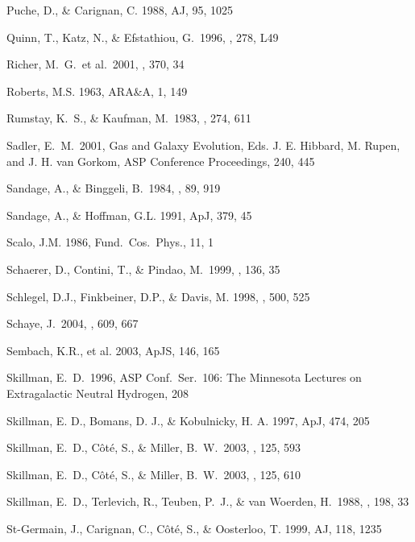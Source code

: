 \documentclass[preprint]{aastex}
\begin{document}
\begin{thebibliography}{}
Puche, D., \& Carignan, C. 1988, AJ, 95, 1025

Quinn, T., Katz, N., \& Efstathiou, G.\ 1996, \mnras, 278, L49 

Richer, M.~G.~et al.\ 2001, \aap, 370, 34 

Roberts, M.S. 1963, ARA\&A, 1, 149

Rumstay, K.~S., \& Kaufman, M.\ 1983, \apj, 274, 611 

Sadler, E.~M.\ 2001, Gas and Galaxy Evolution, 
Eds. J. E. Hibbard, M. Rupen, and J. H. van Gorkom,
ASP Conference Proceedings, 240, 445 

Sandage, A., \& Binggeli, B.\ 1984, \aj, 89, 919

Sandage, A., \& Hoffman, G.L. 1991, ApJ, 379, 45

Scalo, J.M. 1986, Fund.\ Cos.\ Phys., 11, 1

Schaerer, D., Contini, T., \& Pindao, M.\ 1999, \aaps, 136, 35 

Schlegel, D.J., Finkbeiner, D.P., \& Davis, M. 1998, \apj , 500, 525

Schaye, J.\ 2004, \apj, 609, 667 

Sembach, K.R., et al. 2003, ApJS, 146, 165

Skillman, E.~D.\ 1996, ASP Conf.~Ser.~106: 
The Minnesota Lectures on Extragalactic Neutral Hydrogen, 208 

Skillman, E. D., Bomans, D. J., \& Kobulnicky, H. A.  
1997, ApJ, 474, 205

Skillman, E.~D., C{\^o}t{\'e}, S., \& Miller, B.~W.\ 2003, \aj, 125, 593

Skillman, E.~D., C{\^o}t{\'e}, S., \& Miller, B.~W.\ 2003, \aj, 125, 610 

Skillman, E.~D., Terlevich, R., Teuben, P.~J., \& van Woerden, H.\ 1988, \aap, 198, 33 

St-Germain, J., Carignan, C., C\^ot\'e, S., \& Oosterloo, T. 1999, AJ, 118, 1235


\end{thebibliography}
\end{document}
